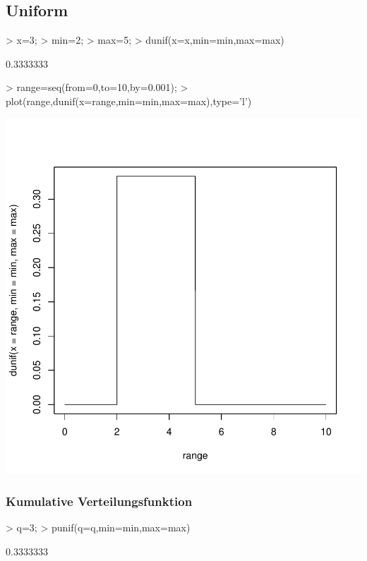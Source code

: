 \subsection{Uniform}
\begin{Schunk}
\begin{Sinput}
> x=3;
> min=2;
> max=5;
> dunif(x=x,min=min,max=max)
\end{Sinput}
\begin{Soutput}
[1] 0.3333333
\end{Soutput}
\begin{Sinput}
> range=seq(from=0,to=10,by=0.001);
> plot(range,dunif(x=range,min=min,max=max),type='l')
\end{Sinput}
\end{Schunk}
\includegraphics{definitionen-017}

\subsubsection{Kumulative Verteilungsfunktion}
\begin{Schunk}
\begin{Sinput}
> q=3;
> punif(q=q,min=min,max=max)
\end{Sinput}
\begin{Soutput}
[1] 0.3333333
\end{Soutput}
\end{Schunk}

